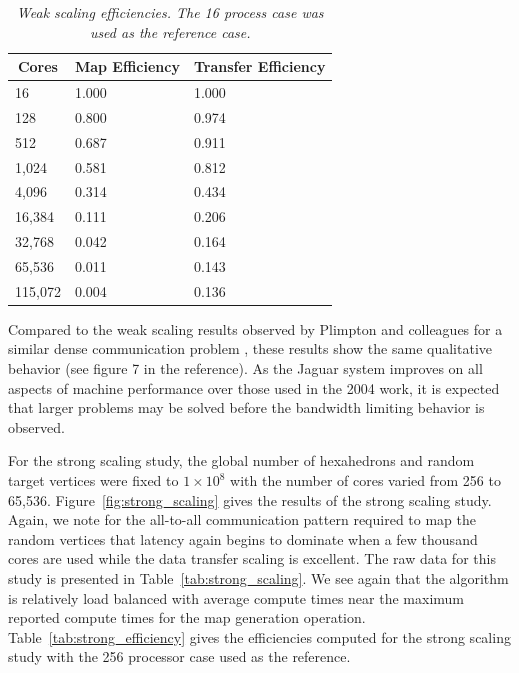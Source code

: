 \documentclass{mc2013}
\begin{document}
\begin{table}[htpb!]
  \begin{center}
    \begin{tabular}{lll}\hline\hline
      \multicolumn{1}{c}{Cores}& \multicolumn{1}{c}{Map Efficiency} &
      \multicolumn{1}{c}{Transfer Efficiency}\\\hline\hline 16 & 1.000
      & 1.000 \\ 128 & 0.800 & 0.974 \\ 512 & 0.687 & 0.911 \\ 1,024 &
      0.581 & 0.812 \\ 4,096 & 0.314 & 0.434 \\ 16,384 & 0.111 & 0.206
      \\ 32,768 & 0.042 & 0.164 \\ 65,536 & 0.011 & 0.143 \\ 115,072 &
      0.004 & 0.136 \\ \hline\hline
    \end{tabular}
  \end{center}
  \caption{\sl Weak scaling efficiencies. The 16 process case was used
    as the reference case.}
  \label{tab:weak_efficiency}
\end{table}

Compared to the weak scaling results observed by Plimpton and
colleagues for a similar dense communication problem
\cite{Plimpton_2004}, these results show the same qualitative behavior
(see figure 7 in the reference). As the Jaguar system improves on all
aspects of machine performance over those used in the 2004 work, it is
expected that larger problems may be solved before the bandwidth
limiting behavior is observed.

\label{subsec:strong_scaling}
For the strong scaling study, the global number of hexahedrons and
random target vertices were fixed to $1 \times 10^8$ with the number
of cores varied from 256 to 65,536. Figure~\ref{fig:strong_scaling}
gives the results of the strong scaling study. Again, we note for the
all-to-all communication pattern required to map the random vertices
that latency again begins to dominate when a few thousand cores are
used while the data transfer scaling is excellent. The raw data for
this study is presented in Table~\ref{tab:strong_scaling}. We see
again that the algorithm is relatively load balanced with average
compute times near the maximum reported compute times for the map
generation operation. Table~\ref{tab:strong_efficiency} gives the
efficiencies computed for the strong scaling study with the 256
processor case used as the reference.
\end{document}
